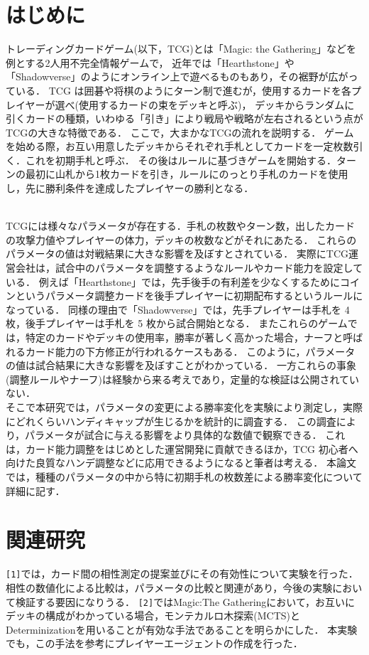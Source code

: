 \documentclass[twocolumn]{ltjsarticle}
\begin{document}
\section{はじめに}
\small{
  トレーディングカードゲーム(以下，TCG)とは「Magic: the Gathering」などを例とする2人用不完全情報ゲームで，
  近年では「Hearthstone」や「Shadowverse」のようにオンライン上で遊べるものもあり，その裾野が広がっている．%
  TCG は囲碁や将棋のようにターン制で進むが，使用するカードを各プレイヤーが選べ(使用するカードの束をデッキと呼ぶ)，
  デッキからランダムに引くカードの種類，いわゆる「引き」により戦局や戦略が左右されるという点がTCGの大きな特徴である．
  ここで，大まかなTCGの流れを説明する．%
  ゲームを始める際，お互い用意したデッキからそれぞれ手札としてカードを一定枚数引く．これを初期手札と呼ぶ．
  その後はルールに基づきゲームを開始する．ターンの最初に山札から1枚カードを引き，ルールにのっとり手札のカードを使用し，先に勝利条件を達成したプレイヤーの勝利となる．

\\TCGには様々なパラメータが存在する．手札の枚数やターン数，出したカードの攻撃力値やプレイヤーの体力，デッキの枚数などがそれにあたる．
  これらのパラメータの値は対戦結果に大きな影響を及ぼすとされている．
  実際にTCG運営会社は，試合中のパラメータを調整するようなルールやカード能力を設定している．
  例えば「Hearthstone」では，先手後手の有利差を少なくするためにコインというパラメータ調整カードを後手プレイヤーに初期配布するというルールになっている．
  同様の理由で「Shadowverse」では，先手プレイヤーは手札を 4 枚，後手プレイヤーは手札を 5 枚から試合開始となる．
  またこれらのゲームでは，特定のカードやデッキの使用率，勝率が著しく高かった場合，ナーフと呼ばれるカード能力の下方修正が行われるケースもある．
  このように，パラメータの値は試合結果に大きな影響を及ぼすことがわかっている．
  一方これらの事象(調整ルールやナーフ)は経験から来る考えであり，定量的な検証は公開されていない．
\\そこで本研究では，パラメータの変更による勝率変化を実験により測定し，実際にどれくらいハンディキャップが生じるかを統計的に調査する．
  この調査により，パラメータが試合に与える影響をより具体的な数値で観察できる．%
  これは，カード能力調整をはじめとした運営開発に貢献できるほか，TCG 初心者へ向けた良質なハンデ調整などに応用できるようになると筆者は考える．
  本論文では，種種のパラメータの中から特に初期手札の枚数差による勝率変化について詳細に記す．
}
\section{関連研究}
\small{
  \verb#[1]#では，カード間の相性測定の提案並びにその有効性について実験を行った．
  相性の数値化による比較は，パラメータの比較と関連があり，今後の実験において検証する要因になりうる．
  \verb#[2]#ではMagic:The Gatheringにおいて，お互いにデッキの構成がわかっている場合，モンテカルロ木探索(MCTS)とDeterminizationを用いることが有効な手法であることを明らかにした．
  本実験でも，この手法を参考にプレイヤーエージェントの作成を行った．
}
\end{document}
